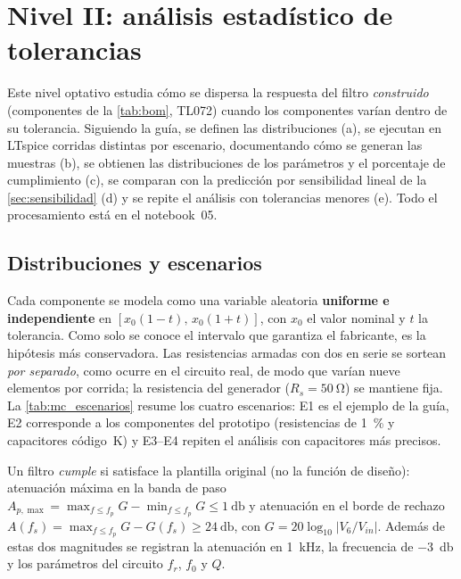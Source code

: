 \section{Nivel II: análisis estadístico de tolerancias}
\label{sec:nivel2}

Este nivel optativo estudia cómo se dispersa la respuesta del filtro \emph{construido} (componentes de la \cref{tab:bom}, TL072) cuando los
componentes varían dentro de su tolerancia. Siguiendo la guía, se definen las distribuciones (a), se ejecutan en LTspice \nNRun{} corridas distintas por
escenario, documentando cómo se generan las muestras (b), se obtienen las distribuciones de los parámetros y el porcentaje de cumplimiento (c), se
comparan con la predicción por sensibilidad lineal de la \cref{sec:sensibilidad} (d) y se repite el análisis con tolerancias menores (e). Todo el
procesamiento está en el notebook~05.

\subsection{Distribuciones y escenarios}
Cada componente se modela como una variable aleatoria \textbf{uniforme e independiente} en $[x_0(1-t),\,x_0(1+t)]$, con $x_0$ el valor nominal y $t$
la tolerancia. Como solo se conoce el intervalo que garantiza el fabricante, es la hipótesis más conservadora. Las resistencias armadas con dos
en serie se sortean \emph{por separado}, como ocurre en el circuito real, de modo que varían nueve elementos por corrida; la resistencia del generador
($R_s = \qty{50}{\ohm}$) se mantiene fija. La \cref{tab:mc_escenarios} resume los cuatro escenarios: E1 es el ejemplo de la guía, E2 corresponde a los
componentes del prototipo (resistencias de \qty{1}{\percent} y capacitores código~K) y E3--E4 repiten el análisis con capacitores más precisos.

\begin{table}[H]
  \centering\small
  \caption{Escenarios del análisis de tolerancias.}
  \label{tab:mc_escenarios}
\end{table}

Un filtro \emph{cumple} si satisface la plantilla original (no la función de diseño): atenuación máxima en la banda de paso
$A_{p,\max} = \max_{f \le f_p} G - \min_{f \le f_p} G \le \qty{1}{\decibel}$ y atenuación en el borde de rechazo
$A(f_s) = \max_{f \le f_p} G - G(f_s) \ge \qty{24}{\decibel}$, con $G = 20\log_{10}|V_6/V_{in}|$. Además de estas dos magnitudes se registran la
atenuación en \qty{1}{\kilo\hertz}, la frecuencia de \qty{-3}{\decibel} y los parámetros del circuito $f_r$, $f_0$ y $Q$.

